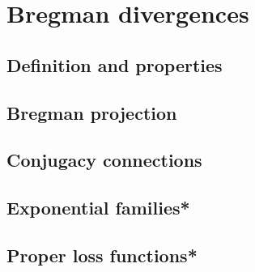 \chapter{Bregman divergences}

\section{Definition and properties}


\section{Bregman projection}



\section{Conjugacy connections}


\section{Exponential families*}






\section{Proper loss functions*}


